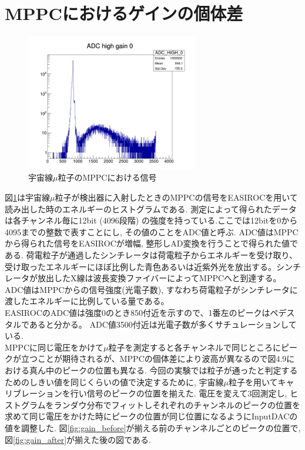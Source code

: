 \section{MPPCにおけるゲインの個体差}\label{sec:mppc_gain_diff}
\begin{figure}[H]
    \centering
    \includegraphics[height=6cm]{img/mppc_gain.jpg}
    \caption{宇宙線$\mu$粒子のMPPCにおける信号}
    \label{fig:mu_mppc}
\end{figure}
図\ref{fig:mu_mppc}は宇宙線$\mu$粒子が検出器に入射したときのMPPCの信号をEASIROCを用いて読み出した時のエネルギーのヒストグラムである.
測定によって得られたデータは各チャンネル毎に12bit (4096段階) の強度を持っている.ここでは12bitを0から4095までの整数で表すことにし, その値のことをADC値と呼ぶ.
ADC値はMPPCから得られた信号をEASIROCが増幅, 整形しAD変換を行うことで得られた値である.
荷電粒子が通過したシンチレータは荷電粒子からエネルギーを受け取り、受け取ったエネルギーにほぼ比例した青色あるいは近紫外光を放出する。シンチレータが放出したX線は波長変換ファイバーによってMPPCへと到達する。
ADC値はMPPCからの信号強度(光電子数), すなわち荷電粒子がシンチレータに渡したエネルギーに比例している量である。
\\
EASIROCのADC値は強度0のとき850付近を示すので、1番左のピークはペデスタルであると分かる。
ADC値3500付近は光電子数が多くサチュレーションしている.\\
MPPCに同じ電圧をかけて$\mu$粒子を測定すると各チャンネルで同じところにピークが立つことが期待されるが、MPPCの個体差により波高が異なるので図4.9における真ん中のピークの位置も異なる.
今回の実験では粒子が通ったと判定するためのしきい値を同じくらいの値で決定するために, 宇宙線$\mu$粒子を用いてキャリブレーションを行い信号のピークの位置を揃えた.
電圧を変えて3回測定し, ヒストグラムをランダウ分布でフィットしそれぞれのチャンネルのピークの位置を求めて同じ電圧をかけた時にピークの位置が同じ位置になるようにInputDACの値を調整した.
図\ref{fig:gain_before}が揃える前のチャンネルごとのピークの位置で, 図\ref{fig:gain_after}が揃えた後の図である.
